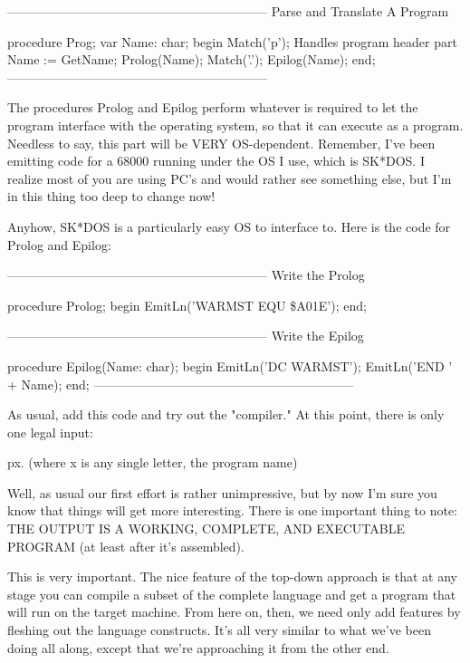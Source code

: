 \documentclass[float=false, crop=false]{standalone}
\begin{document}
{--------------------------------------------------------------}
{ Parse and Translate A Program }

procedure Prog;
var  Name: char;
begin
   Match('p');            { Handles program header part }
   Name := GetName;
   Prolog(Name);
   Match('.');
   Epilog(Name);
end;
{--------------------------------------------------------------}


The procedures Prolog and Epilog perform whatever is required to let the program
interface with the operating system, so that it can execute as a program.
Needless to say, this part will be VERY OS-dependent. Remember, I've been
emitting code for a 68000 running under the OS I use, which is SK*DOS. I realize
most of you are using PC's and would rather see something else, but I'm in this
thing too deep to change now!

Anyhow, SK*DOS is a particularly easy OS to interface to. Here is the code for
Prolog and Epilog:

\begin{code}
{--------------------------------------------------------------}
{ Write the Prolog }

procedure Prolog;
begin
   EmitLn('WARMST EQU \$A01E');
end;


{--------------------------------------------------------------}
{ Write the Epilog }

procedure Epilog(Name: char);
begin
   EmitLn('DC WARMST');
   EmitLn('END ' + Name);
end;
{--------------------------------------------------------------}
\end{code}

As usual, add this code and try out the "compiler." At this point, there is only
one legal input:


     px.   (where x is any single letter, the program name)


Well, as usual our first effort is rather unimpressive, but by now I'm sure you
know that things will get more interesting. There is one important thing to
note: THE OUTPUT IS A WORKING, COMPLETE, AND EXECUTABLE PROGRAM (at least after
it's assembled).

This is very important. The nice feature of the top-down approach is that at any
stage you can compile a subset of the complete language and get a program that
will run on the target machine. From here on, then, we need only add features by
fleshing out the language constructs. It's all very similar to what we've been
doing all along, except that we're approaching it from the other end.
\end{document}
